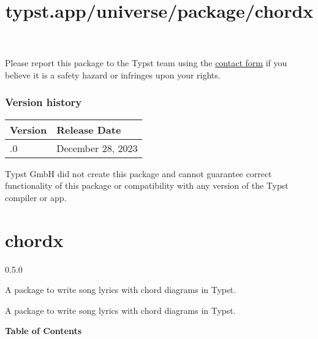 Please report this package to the Typst team using the
\href{https://typst.app/contact}{contact form} if you believe it is a
safety hazard or infringes upon your rights.

\label{versions}
\subsubsection{Version history}\label{version-history}

\begin{longtable}[]{@{}ll@{}}
\toprule\noalign{}
Version & Release Date \\
\midrule\noalign{}
\endhead
\bottomrule\noalign{}
\endlastfoot
0.1.0 & December 28, 2023 \\
\end{longtable}

Typst GmbH did not create this package and cannot guarantee correct
functionality of this package or compatibility with any version of the
Typst compiler or app.


\title{typst.app/universe/package/chordx}

\label{banner}
\section{chordx}\label{chordx}

{ 0.5.0 }

A package to write song lyrics with chord diagrams in Typst.

\label{readme}
A package to write song lyrics with chord diagrams in Typst.

\textbf{Table of Contents}

